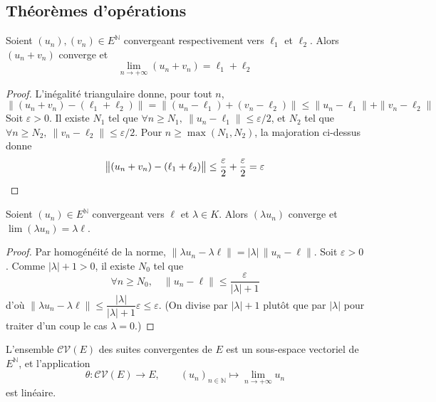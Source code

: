\subsection{Théorèmes d'opérations}

\begin{prop}
\label{prop:somme-limites}
Soient $(u_n),(v_n)\in E^{\mathbb{N}}$ convergeant respectivement vers $\ell_1$ et $\ell_2$. Alors $(u_n+v_n)$ converge et
\[\lim_{n\to+\infty}(u_n+v_n) = \ell_1+\ell_2\]
\end{prop}

\begin{proof}
L'inégalité triangulaire donne, pour tout $n$,
\[\big\|(u_n+v_n)-(\ell_1+\ell_2)\big\| = \big\|(u_n-\ell_1)+(v_n-\ell_2)\big\| \leq \|u_n-\ell_1\|+\|v_n-\ell_2\|\]
Soit $\varepsilon>0$. Il existe $N_1$ tel que $\forall n\geq N_1,\ \|u_n-\ell_1\|\leq\varepsilon/2$, et $N_2$ tel que $\forall n\geq N_2,\ \|v_n-\ell_2\|\leq\varepsilon/2$. Pour $n\geq\max(N_1,N_2)$, la majoration ci-dessus donne
\[\big\|(u_n+v_n)-(\ell_1+\ell_2)\big\| \leq \frac{\varepsilon}{2}+\frac{\varepsilon}{2} = \varepsilon\qedhere\]
\end{proof}

\begin{prop}
\label{prop:scalaire-limite}
Soient $(u_n)\in E^{\mathbb{N}}$ convergeant vers $\ell$ et $\lambda\in K$. Alors $(\lambda u_n)$ converge et $\lim(\lambda u_n)=\lambda\ell$.
\end{prop}

\begin{proof}
Par homogénéité de la norme, $\|\lambda u_n-\lambda\ell\| = |\lambda|\,\|u_n-\ell\|$. Soit $\varepsilon>0$. Comme $|\lambda|+1>0$, il existe $N_0$ tel que
\[\forall n\geq N_0,\quad \|u_n-\ell\|\leq\frac{\varepsilon}{|\lambda|+1}\]
d'où $\|\lambda u_n-\lambda\ell\|\leq\dfrac{|\lambda|}{|\lambda|+1}\varepsilon\leq\varepsilon$. (On divise par $|\lambda|+1$ plutôt que par $|\lambda|$ pour traiter d'un coup le cas $\lambda=0$.)
\end{proof}

\begin{coro}
\label{coro:cv-sev}
L'ensemble $\mathcal{CV}(E)$ des suites convergentes de $E$ est un sous-espace vectoriel de $E^{\mathbb{N}}$, et l'application
\[\theta : \mathcal{CV}(E)\longrightarrow E, \qquad (u_n)_{n\in\mathbb{N}}\longmapsto \lim_{n\to+\infty}u_n\]
est linéaire.
\end{coro}

